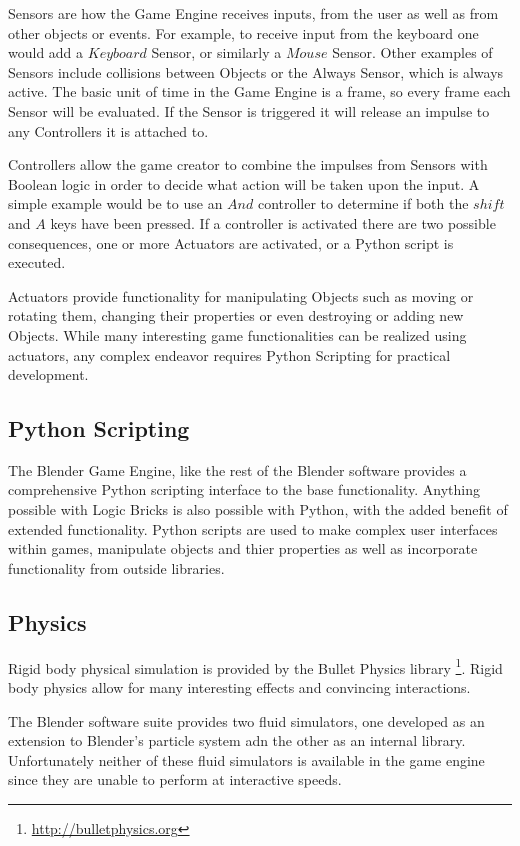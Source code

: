 Sensors are how the Game Engine receives inputs, from the user as well as from
other objects or events. For example, to receive input from the keyboard one
would add a $Keyboard$ Sensor, or similarly a $Mouse$ Sensor. Other examples of
Sensors include collisions between Objects or the Always Sensor, which is
always active. The basic unit of time in the Game Engine is a frame,
so every frame each Sensor will be evaluated. If the Sensor is triggered it
will release an impulse to any Controllers it is attached to.


Controllers allow the game creator to combine the impulses from Sensors with
Boolean logic in order to decide what action will be taken upon the input. A
simple example would be to use an $And$ controller to determine if both the
$shift$ and $A$ keys have been pressed. If a controller is activated there are
two possible consequences, one or more Actuators are activated, or a Python
script is executed.


Actuators provide functionality for manipulating Objects such as moving or
rotating them, changing their properties or even destroying or adding new
Objects. While many interesting game functionalities can be realized using
actuators, any complex endeavor requires Python Scripting for practical
development.

\subsection{Python Scripting}
The Blender Game Engine, like the rest of the Blender software provides a
comprehensive Python scripting interface to the base functionality. Anything
possible with Logic Bricks is also possible with Python, with the added benefit
of extended functionality. Python scripts are used to make complex user
interfaces within games, manipulate objects and thier properties as well as
incorporate functionality from outside libraries.


\subsection{Physics}
Rigid body physical simulation is provided by the Bullet Physics library
\footnote{\url{http://bulletphysics.org}}. Rigid body physics allow for many interesting
effects and convincing interactions. 

The Blender software suite provides two fluid simulators, one developed as an
extension to Blender's particle system adn the other as an internal library.
Unfortunately neither of these fluid simulators is available in the game engine
since they are unable to perform at interactive speeds.



